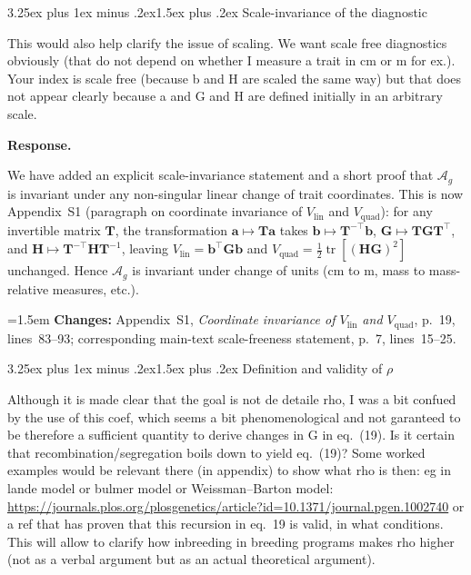 \documentclass[11pt,a4paper]{article}
\makeatletter
\newcommand{\response}{%
  \par\medskip\noindent\textbf{\color{ResponseColor}Response.}\quad\ignorespaces
}
\newcommand{\changesat}[1]{%
  \par\smallskip\noindent\hangindent=1.5em\hangafter=1
  \textbf{\color{ChangeColor}Changes:} \quad #1\par\medskip
}
\renewcommand{\subsection}{\@startsection{subsection}{2}{0pt}%
  {3.25ex plus 1ex minus .2ex}{1.5ex plus .2ex}%
  {\large\bfseries}}
\newcommand{\Ag}{\ensuremath{\mathcal{A}_{g}}\xspace}
\newcommand{\Vlin}{\ensuremath{V_{\mathrm{lin}}}\xspace}
\newcommand{\Vquad}{\ensuremath{V_{\mathrm{quad}}}\xspace}
\newcommand{\mat}[1]{\ensuremath{\mathbf{#1}}}
\newcommand{\vect}[1]{\ensuremath{\bm{#1}}}
\newcommand{\tr}{\ensuremath{\operatorname{tr}}\xspace}
\makeatother
\begin{document}
\subsection{Scale-invariance of the diagnostic}

\begin{edquote}
This would also help clarify the issue of scaling. We want scale free diagnostics obviously (that do not depend on whether I measure a trait in cm or m for ex.). Your index is scale free (because b and H are scaled the same way) but that does not appear clearly because a and G and H are defined initially in an arbitrary scale.
\end{edquote}

\response
We have added an explicit scale-invariance statement and a short proof that $\Ag$ is invariant under any non-singular linear change of trait coordinates. This is now Appendix~S1 (paragraph on coordinate invariance of $\Vlin$ and $\Vquad$): for any invertible matrix $\mat{T}$, the transformation $\vect{a} \mapsto \mat{T}\vect{a}$ takes $\vect{b} \mapsto \mat{T}^{-\top}\vect{b}$, $\mat{G} \mapsto \mat{T}\mat{G}\mat{T}^{\top}$, and $\mat{H} \mapsto \mat{T}^{-\top}\mat{H}\mat{T}^{-1}$, leaving $\Vlin = \vect{b}^{\top}\mat{G}\vect{b}$ and $\Vquad = \tfrac{1}{2}\tr[(\mat{H}\mat{G})^2]$ unchanged. Hence $\Ag$ is invariant under change of units (cm to m, mass to mass-relative measures, etc.).

\changesat{Appendix~S1, \textit{Coordinate invariance of \Vlin and \Vquad}, p.~19, lines~83--93; corresponding main-text scale-freeness statement, p.~7, lines~15--25.}

\subsection{\texorpdfstring{Definition and validity of $\rho$}{Definition and validity of rho}}

\begin{edquote}
Although it is made clear that the goal is not de detaile rho, I was a bit confued by the use of this coef, which seems a bit phenomenological and not garanteed to be therefore a sufficient quantity to derive changes in G in eq.~(19). Is it certain that recombination/segregation boils down to yield eq.~(19)? Some worked examples would be relevant there (in appendix) to show what rho is then: eg in lande model or bulmer model or Weissman--Barton model: \url{https://journals.plos.org/plosgenetics/article?id=10.1371/journal.pgen.1002740} or a ref that has proven that this recursion in eq.~19 is valid, in what conditions. This will allow to clarify how inbreeding in breeding programs makes rho higher (not as a verbal argument but as an actual theoretical argument).
\end{edquote}
\end{document}
